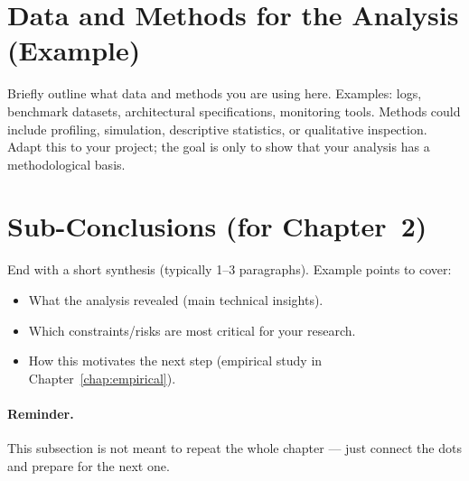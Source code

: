 \section{Data and Methods for the Analysis (Example)}
\label{sec:datamethods}
Briefly outline what data and methods you are using here.  
Examples: logs, benchmark datasets, architectural specifications, monitoring tools.  
Methods could include profiling, simulation, descriptive statistics, or qualitative inspection.  
Adapt this to your project; the goal is only to show that your analysis has a methodological basis.

\section{Sub-Conclusions (for Chapter~2)}
\label{sec:subconcl}
End with a short synthesis (typically 1–3 paragraphs).  
Example points to cover:

\begin{itemize}[leftmargin=1.2cm]
  \item What the analysis revealed (main technical insights).
  \item Which constraints/risks are most critical for your research.
  \item How this motivates the next step (empirical study in Chapter~\ref{chap:empirical}).
\end{itemize}

\paragraph{Reminder.} This subsection is not meant to repeat the whole chapter — just connect the dots and prepare for the next one.

